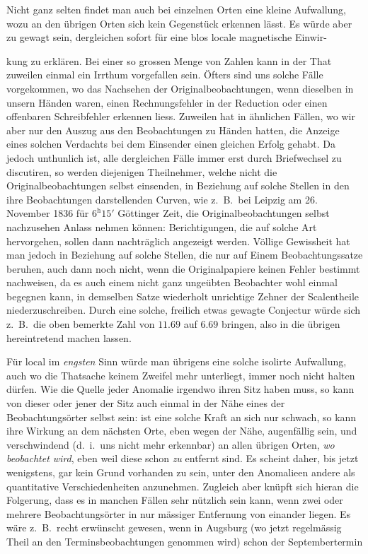 Nicht ganz selten findet man auch bei einzelnen Orten eine kleine Aufwallung, wozu an den übrigen Orten sich kein Gegenstück erkennen lässt. Es würde aber zu gewagt sein, dergleichen sofort für eine blos locale magnetische Einwir-\par
\clearpage
{}
\noindent kung zu erklären. Bei einer so grossen Menge von Zahlen kann in der That zuweilen einmal ein Irrthum vorgefallen sein. Öfters sind uns solche Fälle vorgekommen, wo das Nachsehen der Originalbeobachtungen, wenn dieselben in unsern Händen waren, einen Rechnungsfehler in der Reduction oder einen offenbaren Schreibfehler erkennen liess. Zuweilen hat in ähnlichen Fällen, wo wir aber nur den Auszug aus den Beobachtungen zu Händen hatten, die Anzeige eines solchen Verdachts bei dem Einsender einen gleichen Erfolg gehabt. Da jedoch unthunlich ist, alle dergleichen Fälle immer erst durch Briefwechsel zu discutiren, so werden diejenigen Theilnehmer, welche nicht die Originalbeobachtungen selbst einsenden, in Beziehung auf solche Stellen in den ihre Beobachtungen darstellenden Curven, wie z.\ B.\ bei Leipzig am 26. November 1836 für $6^{\mathrm h}15'$ Göttinger Zeit, die Originalbeobachtungen selbst nachzusehen Anlass nehmen können: Berichtigungen, die auf solche Art hervorgehen, sollen dann nachträglich angezeigt werden. Völlige Gewissheit hat man jedoch in Beziehung auf solche Stellen, die nur auf Einem Beobachtungssatze beruhen, auch dann noch nicht, wenn die Originalpapiere keinen Fehler bestimmt nachweisen, da es auch einem nicht ganz ungeübten Beobachter wohl einmal begegnen kann, in demselben Satze wiederholt unrichtige Zehner der Scalentheile niederzuschreiben. Durch eine solche, freilich etwas gewagte Conjectur würde sich z.\ B.\ die oben bemerkte Zahl von $11.69$ auf $6.69$ bringen, also in die übrigen hereintretend machen lassen.

Für local im \textit{engsten} Sinn würde man übrigens eine solche isolirte Aufwallung, auch wo die Thatsache keinem Zweifel mehr unterliegt, immer noch nicht halten dürfen. Wie die Quelle jeder Anomalie irgendwo ihren Sitz haben muss, so kann von dieser oder jener der Sitz auch einmal in der Nähe eines der Beobachtungsörter selbst sein: ist eine solche Kraft an sich nur schwach, so kann ihre Wirkung an dem nächsten Orte, eben wegen der Nähe, augenfällig sein, und verschwindend (d.\ i.\ uns nicht mehr erkennbar) an allen übrigen Orten, \textit{wo beobachtet wird}, eben weil diese schon \textit{zu} entfernt sind. Es scheint daher, bis jetzt wenigstens, gar kein Grund vorhanden zu sein, unter den Anomalieen andere als quantitative Verschiedenheiten anzunehmen. Zugleich aber knüpft sich hieran die Folgerung, dass es in manchen Fällen sehr nützlich sein kann, wenn zwei oder mehrere Beobachtungsörter in nur mässiger Entfernung von einander liegen. Es wäre z.\ B.\ recht erwünscht gewesen, wenn in Augsburg (wo jetzt regelmässig Theil an den Terminsbeobachtungen genommen wird) schon der Septembertermin
